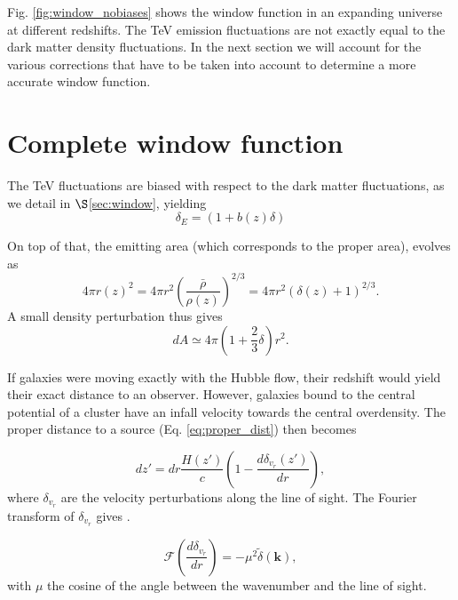 \documentclass[twocolumns]{emulateapj}
\begin{document}
Fig. \ref{fig:window_nobiases} shows the window function in an expanding universe at different redshifts.  %
The TeV emission fluctuations are not exactly equal to the dark matter density fluctuations. In the next section we will account for the various corrections that have to be taken into account to determine a more accurate window function.


\section{Complete window function}

The TeV fluctuations are biased with respect to the dark matter fluctuations, as we detail in $\S$\ref{sec:window}, yielding 
\begin{equation}
  \delta_E=(1+b(z)\delta)
\label{eq:bias}
\end{equation}

On top of that, the emitting area (which corresponds to the proper area), evolves as
  \begin{equation}
    \label{eq:emitting_area}
4\pi r(z)^2=4\pi r^2\left(\frac{\bar{\rho}}{\rho(z)}\right)^{2/3}=4\pi r^2(\delta(z)+1)^{2/3}.
  \end{equation}
A small density perturbation thus gives
\begin{equation}
  \label{eq:pert_area}
dA\simeq 4\pi \left(1+\frac{2}{3}\delta\right)r^2.
\end{equation}

If galaxies were moving exactly with the Hubble flow, their redshift would yield their exact distance to an observer. However, galaxies bound to the central potential of a cluster have an infall velocity towards the central overdensity. The proper distance to a source  (Eq. \ref{eq:proper_dist}) then becomes

  \begin{equation}
    \label{eq:vel_perturb}
    dz'=dr\frac{H(z')}{c}\left(1-\frac{d\delta_{v_r}(z')}{dr}\right),
  \end{equation}
where $\delta_{v_r}$ are the velocity perturbations along the line of sight. The Fourier transform of $\delta_{v_r}$ gives  \citep{1987MNRAS.227....1K}.

\begin{equation}
  \label{eq:kaiser2}
  \mathcal{F}\left(\frac{d\delta_{v_r}}{dr}\right)=-\mu^2\tilde{\delta}(\mathbf{k}),
\end{equation}
with $\mu$ the cosine of the angle between the wavenumber and the line of sight.
\end{document}
